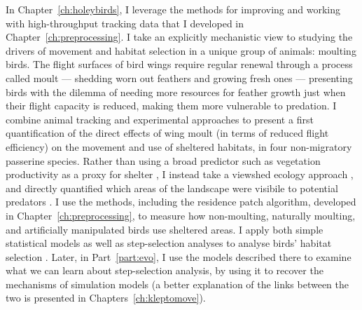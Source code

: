 In Chapter~\ref{ch:holeybirds}, I leverage the methods for improving and working with high-throughput tracking data that I developed in Chapter~\ref{ch:preprocessing}.
I take an explicitly mechanistic view to studying the drivers of movement and habitat selection in a unique group of animals: moulting birds.
The flight surfaces of bird wings require regular renewal through a process called moult --- shedding worn out feathers and growing fresh ones --- presenting birds with the dilemma of needing more resources for feather growth just when their flight capacity is reduced, making them more vulnerable to predation.
I combine animal tracking and experimental approaches to present a first quantification of the direct effects of wing moult (in terms of reduced flight efficiency) on the movement and use of sheltered habitats, in four non-migratory passerine species.
Rather than using a broad predictor such as vegetation productivity as a proxy for shelter \parencite{pettorelli2011}, I instead take a viewshed ecology approach \parencite{aben2018}, and directly quantified which areas of the landscape were visibile to potential predators \parencite[the `fearscape'][]{olsoy2015}.
I use the methods, including the residence patch algorithm, developed in Chapter~\ref{ch:preprocessing}, to measure how non-moulting, naturally moulting, and artificially manipulated birds use sheltered areas.
I apply both simple statistical models as well as step-selection analyses to analyse birds' habitat selection \parencite{fortin2005,avgar2016}.
Later, in Part~\ref{part:evo}, I use the models described there to examine what we can learn about step-selection analysis, by using it to recover the mechanisms of simulation models (a better explanation of the links between the two is presented in Chapters~\ref{ch:kleptomove}).

\medskip

